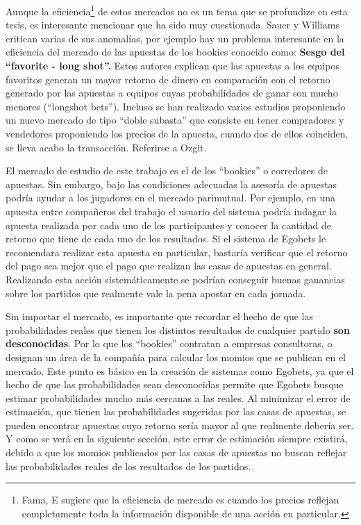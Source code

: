 Aunque la eficiencia\footnote{Fama, E \cite{fama1998market} sugiere que la eficiencia de mercado es cuando los precios reflejan completamente toda la información disponible de una acción en particular.} de estos mercados no es un tema que se profundize en esta tesis, es interesante mencionar que ha sido  muy cuestionada. Sauer \cite{sauer1998economics} y Williams \cite{williams1999information} critican varias de sus anomalías, por ejemplo hay un problema interesante en la eficiencia del mercado de las apuestas de los bookies conocido como: \textbf{Sesgo del ``favorite - long shot''.} Estos autores explican que las apuestas a los equipos favoritos generan un mayor retorno de dinero en comparación con el retorno generado por las apuestas a equipos cuyas probabilidades de ganar son mucho menores (``longshot bets''). Incluso se han realizado varios estudios proponiendo un nuevo mercado de tipo ``doble subasta'' que consiste en tener compradores y vendedores proponiendo los precios de la apuesta, cuando dos de ellos coinciden, se lleva acabo la transacción. Referirse a Ozgit\cite{ozgit2005posted}.

El mercado de estudio de este trabajo es el de los ``bookies'' o corredores de apuestas. Sin embargo, bajo las condiciones adecuadas la asesoría de apuestas podría ayudar a los jugadores en el mercado parimutual. Por ejemplo, en una apuesta entre compañeros del trabajo el usuario del sistema podría indagar la apuesta realizada por cada uno de los participantes y conocer la cantidad de retorno que tiene de cada uno de los resultados. Si el sistema de Egobets le recomendara realizar esta apuesta en particular, bastaría verificar que el retorno del pago sea mejor que el pago que realizan las casas de apuestas en general. Realizando esta acción sistemáticamente se podrían conseguir buenas ganancias sobre los partidos que realmente vale la pena apostar en cada jornada.

Sin importar el mercado, es importante que recordar el hecho de que las probabilidades reales que tienen los distintos resultados de cualquier partido \textbf{son desconocidas}. Por lo que los ``bookies'' contratan a empresas consultoras, o designan un área de la compañía para calcular los momios que se publican en el mercado. Este punto es básico en la creación de sistemas como Egobets, ya que el hecho de que las probabilidades sean desconocidas permite que Egobets busque estimar probabilidades mucho más cercanas a las reales. Al minimizar el error de estimación, que tienen las probabilidades sugeridas por las casas de apuestas, se pueden encontrar apuestas cuyo retorno sería mayor al que realmente debería ser. Y como se verá en la siguiente sección, este error de estimación siempre existirá, debido a que los momios publicados por las casas de apuestas no buscan reflejar las probabilidades reales de los resultados de los partidos.

